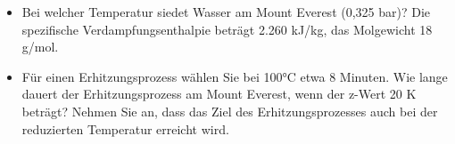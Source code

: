 \documentclass[a4paper,11pt]{article}
\newif\ifshowme
\begin{document}
\begin{itemize}
\item 
Bei welcher Temperatur siedet Wasser am Mount Everest (0,325 bar)? Die spezifische
Verdampfungsenthalpie beträgt 2.260 kJ/kg, das Molgewicht 18 g/mol.
\ifshowme
\antwort{
\begin{align*}
\ln(\frac{p_2}{p_1})\frac{R}{\Delta h_{vM}}+\frac{1}{T_2}&=\frac{1}{T_1} \\
\ln(\frac{101.325}{32.500}) \cdot \frac{8,314 ~\text{J/(mol K)}}{2,26 \cdot 10^6 ~\text{J/kg} \cdot 0,018 ~\text{kg/mol}}+\frac{1}{373,15}&=2,915 \cdot 10^{-3} \qquad | :\frac{1}{x} \\ 
&=343 ~\text{K}
\end{align*} 
}
\else
\fi
\item Für einen Erhitzungsprozess wählen Sie bei 100°C etwa 8 Minuten. Wie lange dauert der Erhitzungsprozess am Mount Everest, wenn der z-Wert 20 K beträgt? Nehmen Sie an, dass
das Ziel des Erhitzungsprozesses auch bei der reduzierten Temperatur erreicht wird. 
\ifshowme
\antwort{
\begin{align*}
F_1 &= F_2 \cdot 10^{\frac{T_2-T_1}{z}} \\
F_1 &= 8~\text{min} \cdot 10^{\frac{373,15-343}{20}} \\
 &= 257,38 ~\text{min}
\end{align*}


in der Übung war das Ergebnis 246 min. Wahrscheinlich aber aufgrund von anderer Rundung beim vorherigen Ergebnis. Außerdem wird in der Übung für 100°C \RA 373 K angenommen.
}



\else
\fi

\end{itemize}
\end{document}
